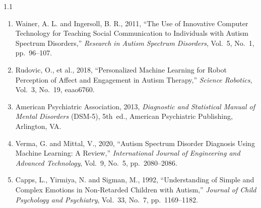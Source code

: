 \documentclass[12pt,a4paper,oneside]{report}
\begin{document}
\begin{spacing}{1.1}
\begin{enumerate}[leftmargin=0pt, itemindent=0pt, labelsep=0.5em,
			labelwidth=1.5em, itemsep=6pt, parsep=0pt,
			label={\arabic*.},
			ref={\arabic*},
			align=left]
			\item Wainer, A. L. and Ingersoll, B. R., 2011, ``The Use of Innovative Computer Technology for Teaching Social Communication to Individuals with Autism Spectrum Disorders,'' \textit{Research in Autism Spectrum Disorders}, Vol.~5, No.~1, pp.~96--107.
			
			\item Rudovic, O., et al., 2018, ``Personalized Machine Learning for Robot Perception of Affect and Engagement in Autism Therapy,'' \textit{Science Robotics}, Vol.~3, No.~19, eaao6760.
			
			\item American Psychiatric Association, 2013, \textit{Diagnostic and Statistical Manual of Mental Disorders} (DSM-5), 5th~ed., American Psychiatric Publishing, Arlington, VA.
			
			\item Verma, G. and Mittal, V., 2020, ``Autism Spectrum Disorder Diagnosis Using Machine Learning: A Review,'' \textit{International Journal of Engineering and Advanced Technology}, Vol.~9, No.~5, pp.~2080--2086.
			
			\item Capps, L., Yirmiya, N. and Sigman, M., 1992, ``Understanding of Simple and Complex Emotions in Non-Retarded Children with Autism,'' \textit{Journal of Child Psychology and Psychiatry}, Vol.~33, No.~7, pp.~1169--1182.
			
		\end{enumerate}
	\end{spacing}
	
\end{document}
